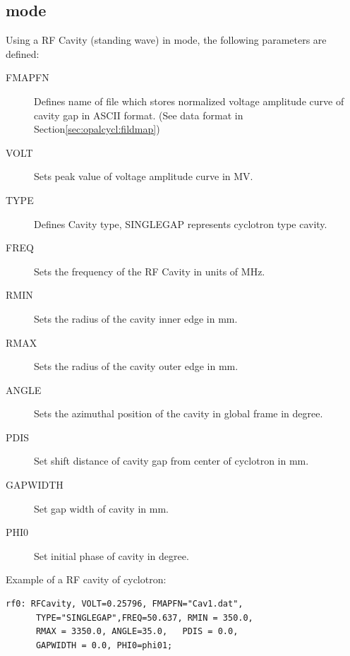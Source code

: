 \subsection{\opalcycl mode}
\label{sec:cavity-cycl}
Using a RF Cavity (standing wave) in \opalcycl mode, the following  parameters are defined:
\begin{description}
\item[FMAPFN]
  Defines name of file which stores normalized voltage amplitude curve of cavity gap in ASCII format.
  (See data format in Section\ref{sec:opalcycl:fildmap})
 \item[VOLT]
  Sets peak value of voltage amplitude curve in MV.
  \item[TYPE]
  Defines Cavity type, SINGLEGAP represents cyclotron type cavity.   
  \item[FREQ]
  Sets the frequency of the RF Cavity in units of MHz. 
  \item[RMIN]
  Sets the radius of the cavity inner edge in mm.
  \item[RMAX]
  Sets the radius of the cavity outer edge in mm.

  \item[ANGLE]
  Sets the azimuthal position of the cavity in global frame in degree. 

  \item[PDIS]
  Set shift distance of cavity gap from center of cyclotron in mm.
  
  \item[GAPWIDTH]
  Set gap width of  cavity in mm.

  \item[PHI0]
  Set initial phase of cavity in degree.

\end{description}

\noindent Example of a RF cavity of cyclotron:
\begin{verbatim}
rf0: RFCavity, VOLT=0.25796, FMAPFN="Cav1.dat",
      TYPE="SINGLEGAP",FREQ=50.637, RMIN = 350.0,
      RMAX = 3350.0, ANGLE=35.0,   PDIS = 0.0,
      GAPWIDTH = 0.0, PHI0=phi01;
\end{verbatim}

